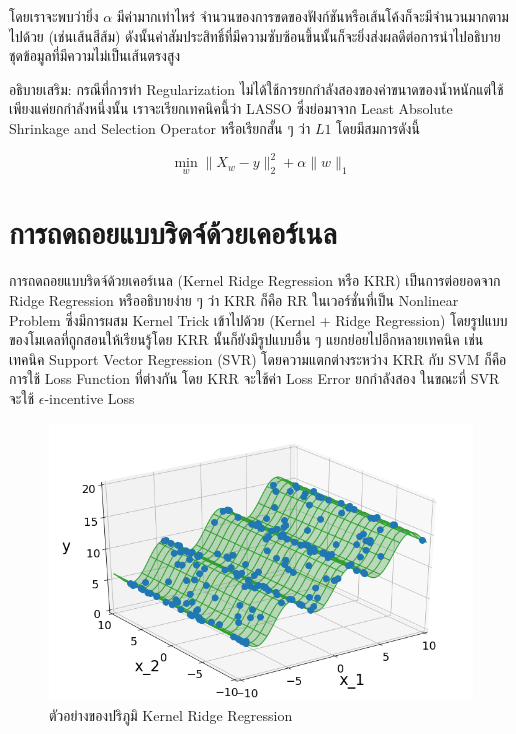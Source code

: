 \noindent โดยเราจะพบว่ายิ่ง $\alpha$ มีค่ามากเท่าไหร่ จำนวนของการขดของฟังก์ชันหรือเส้นโค้งก็จะมีจำนวนมากตามไปด้วย (เช่นเส้นสีส้ม) 
ดังนั้นค่าสัมประสิทธิ์ที่มีความซับซ้อนขึ้นนั้นก็จะยิ่งส่งผลดีต่อการนำไปอธิบายชุดข้อมูลที่มีความไม่เป็นเส้นตรงสูง

อธิบายเสริม: กรณีที่การทำ Regularization ไม่ได้ใช้การยกกำลังสองของค่าขนาดของน้ำหนักแต่ใช้เพียงแค่ยกกำลังหนึ่งนั้น เราจะเรียกเทคนิคนี้ว่า
LASSO ซึ่งย่อมาจาก Least Absolute Shrinkage and Selection Operator หรือเรียกสั้น ๆ ว่า $L1$ โดยมีสมการดังนี้

\begin{equation}
    \min_{w} \lVert X_{w} - y \rVert_{2}^{2} + \alpha \lVert w \rVert_{1}
\end{equation}

\section{การถดถอยแบบริดจ์ด้วยเคอร์เนล}
\label{sec:kernel_ridge}

การถดถอยแบบริดจ์ด้วยเคอร์เนล (Kernel Ridge Regression หรือ KRR) เป็นการต่อยอดจาก Ridge Regression หรืออธิบายง่าย ๆ ว่า 
KRR ก็คือ RR ในเวอร์ชั่นที่เป็น Nonlinear Problem ซึ่งมีการผสม Kernel Trick เข้าไปด้วย (Kernel + Ridge Regression) 
โดยรูปแบบของโมเดลที่ถูกสอนให้เรียนรู้โดย KRR นั้นก็ยังมีรูปแบบอื่น ๆ แยกย่อยไปอีกหลายเทคนิค เช่น เทคนิค Support Vector Regression 
(SVR) โดยความแตกต่างระหว่าง KRR กับ SVM ก็คือการใช้ Loss Function ที่ต่างกัน โดย KRR จะใช้ค่า Loss Error ยกกำลังสอง ในขณะที่ 
SVR จะใช้ $\epsilon$-incentive Loss

\begin{figure}[H]
    \centering
    \includegraphics[width=0.9\linewidth]{fig/krr_space.png}
    \caption{ตัวอย่างของปริภูมิ Kernel Ridge Regression}
    \label{fig:krr_space}
\end{figure}

